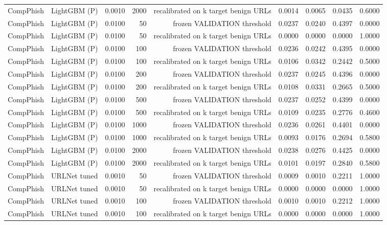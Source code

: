 \begin{table}[t]
\begin{tabular}{llrrrrrrr}
CompPhish & LightGBM (P) & 0.0010 & 2000 & recalibrated on k target benign URLs & 0.0014 & 0.0065 & 0.0435 & 0.6000 \\
CompPhish & LightGBM (P) & 0.0100 & 50 & frozen VALIDATION threshold & 0.0237 & 0.0240 & 0.4397 & 0.0000 \\
CompPhish & LightGBM (P) & 0.0100 & 50 & recalibrated on k target benign URLs & 0.0000 & 0.0000 & 0.0000 & 1.0000 \\
CompPhish & LightGBM (P) & 0.0100 & 100 & frozen VALIDATION threshold & 0.0236 & 0.0242 & 0.4395 & 0.0000 \\
CompPhish & LightGBM (P) & 0.0100 & 100 & recalibrated on k target benign URLs & 0.0106 & 0.0342 & 0.2442 & 0.5000 \\
CompPhish & LightGBM (P) & 0.0100 & 200 & frozen VALIDATION threshold & 0.0237 & 0.0245 & 0.4396 & 0.0000 \\
CompPhish & LightGBM (P) & 0.0100 & 200 & recalibrated on k target benign URLs & 0.0108 & 0.0331 & 0.2665 & 0.5000 \\
CompPhish & LightGBM (P) & 0.0100 & 500 & frozen VALIDATION threshold & 0.0237 & 0.0252 & 0.4399 & 0.0000 \\
CompPhish & LightGBM (P) & 0.0100 & 500 & recalibrated on k target benign URLs & 0.0109 & 0.0235 & 0.2776 & 0.4600 \\
CompPhish & LightGBM (P) & 0.0100 & 1000 & frozen VALIDATION threshold & 0.0236 & 0.0261 & 0.4401 & 0.0000 \\
CompPhish & LightGBM (P) & 0.0100 & 1000 & recalibrated on k target benign URLs & 0.0093 & 0.0176 & 0.2694 & 0.5800 \\
CompPhish & LightGBM (P) & 0.0100 & 2000 & frozen VALIDATION threshold & 0.0238 & 0.0276 & 0.4425 & 0.0000 \\
CompPhish & LightGBM (P) & 0.0100 & 2000 & recalibrated on k target benign URLs & 0.0101 & 0.0197 & 0.2840 & 0.5800 \\
CompPhish & URLNet tuned & 0.0010 & 50 & frozen VALIDATION threshold & 0.0009 & 0.0010 & 0.2211 & 1.0000 \\
CompPhish & URLNet tuned & 0.0010 & 50 & recalibrated on k target benign URLs & 0.0000 & 0.0000 & 0.0000 & 1.0000 \\
CompPhish & URLNet tuned & 0.0010 & 100 & frozen VALIDATION threshold & 0.0010 & 0.0010 & 0.2212 & 1.0000 \\
CompPhish & URLNet tuned & 0.0010 & 100 & recalibrated on k target benign URLs & 0.0000 & 0.0000 & 0.0000 & 1.0000 \\

\end{tabular}
\end{table}
